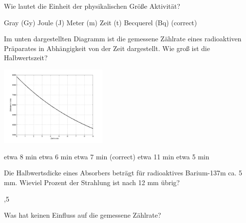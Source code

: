 \documentclass[11pt]{exam}
\begin{document}
\setlength{\voffset}{-0.5in}
\setlength{\headsep}{5pt}

\hspace{2mm}
 \hspace{5mm}
\vspace{4mm}

\begin{questions}

\question Wie lautet die Einheit der physikalischen Größe Aktivität?

\begin{choices}
	\choice Gray (Gy)
	\choice Joule (J)
	\choice Meter (m)
	\choice Zeit (t)
	\choice Becquerel (Bq) (correct)
\end{choices}

\vspace{3mm}\question Im unten dargestellten Diagramm ist die gemessene Zählrate eines radioaktiven Präparates in Abhängigkeit von der Zeit dargestellt. Wie groß ist die Halbwertszeit?

\includegraphics[width=0.4\textwidth]{images/zerfall2.png}

\begin{choices}
	\choice etwa 8 min
	\choice etwa 6 min
	\choice etwa 7 min (correct)
	\choice etwa 11 min
	\choice etwa 5 min
\end{choices}

\vspace{3mm}\question Die Halbwertsdicke eines Absorbers beträgt für radioaktives Barium-137m ca. 5 mm. Wieviel Prozent der Strahlung ist nach 12 mm übrig?

\begin{choices}
	,5 %
\end{choices}

\vspace{3mm}\question Was hat keinen Einfluss auf die gemessene Zählrate?


\end{questions}
\end{document}
